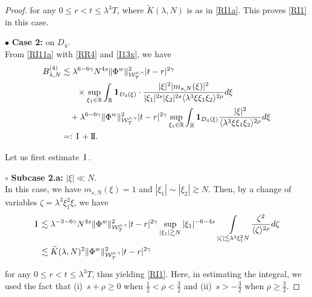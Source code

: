 \documentclass[letterpaper, 11pt,  reqno]{amsart}
\DeclareMathOperator*{\intt}{\int}
\newcommand{\1}{\hspace{0.5mm}\text{I}\hspace{0.5mm}}
\newcommand{\II}{\text{I \hspace{-2.8mm} I} }
\newcommand{\noi}{\noindent}
\newcommand{\R}{\mathbb{R}}
\newcommand{\g}{\gamma}
\newcommand{\ld}{\lambda}
\newcommand{\wt}{\widetilde}
\newcommand{\les}{\lesssim}
\newcommand{\ges}{\gtrsim}
\newcommand{\jb}[1]
{\langle #1 \rangle}
\newcommand{\ind}{\mathbf 1}
\newcommand{\W}{\mathcal{W}}
\newcommand{\z}{\zeta}
\numberwithin{equation}{section}
\numberwithin{theorem}{section}
\begin{document}
\begin{proof}
 
 \noi
for any $0\leq r<t\leq \ld^3T$, 
where $\wt K(\ld, N)$ is as in \eqref{RI1a}. 
This proves
 \eqref{RI1} in this case.






\medskip

\noi
$\bullet$ \textbf{Case 2:} on  $D_4$.\\
\indent
From \eqref{RI11a} with \eqref{RR4}  and \eqref{I13x}, we have 
\begin{align}
\begin{split}
B_{\ld, N}^{(4)}
& \les 
\ld^{6- 6\g}N^{4s }
\| \Phi^{w} \|^2_{\W_{T}^{\rho, \g}} 
|t-r|^{2\g} \\
& \hphantom{XX}
\times
\sup_{\xi_1 \in \R}
\int_\R
\ind_{D_4(\xi)}\cdot
\frac{|\xi|^2  |m_{s, N}(\xi)|^2}{|\xi_1|^{2s}|\xi_2|^{2s}\jb{\ld^3 \xi \xi_1 \xi_2}^{2\rho}}d\xi \\
& \quad + 
\ld^{6 -6\g}
\| \Phi^{w} \|^2_{\W_{T}^{\rho, \g}} 
|t-r|^{2\g}
\sup_{\xi_1 \in \R}
\int_\R
\ind_{D_4(\xi)}
\frac{|\xi|^2 }{\jb{\ld^3 \xi \xi_1 \xi_2}^{2\rho}}d\xi \\
 & =: \1 + \II.
\end{split}
\label{RI13a}
\end{align}









Let us first estimate $\1$.



\noi
$\circ$ {\bf Subcase 2.a:}  $|\xi| \ll N$.\\
\indent
In this case, we have $m_{s, N}(\xi) = 1$
and  $|\xi_1|\sim |\xi_2|\ges N$.
Then, by 
a change of variables $\z = \ld^3 \xi_1^2 \xi$, we have 
\begin{align*}
\1
& \les 
\ld^{-3- 6\g}N^{ 4s}
 \| \Phi^{w} \|^2_{\W_{T}^{\rho, \g}}  
|t-r|^{2\g}
\sup_{|\xi_1|\ges N}|\xi_1|^{-6-4s}
\intt_{ |\z|\les \ld^3 \xi_1^2N } \frac{\z^{2}}{\jb{\z}^{2\rho}}d \z\\
 &\les 
\wt K(\ld, N)^2
 \| \Phi^{w} \|^2_{\W_{T}^{\rho, \g}}  
|t-r|^{2\g}
\end{align*}

\noi
for any $0\leq r<t\leq \ld^3T$, 
thus yielding \eqref{RI1}.
Here, 
in estimating the integral, 
we used the fact that 
(i)~$s+ \rho \ge 0$
when $\frac 12< \rho < \frac 32$
and 
(ii)~$s > -\frac 32$ when $\rho \ge \frac 32$.








\end{proof}
\end{document}
